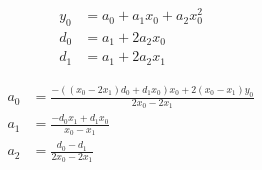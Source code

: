 \begin{align}
  y_0 & = a_0+a_1 x_0+a_2 x_0^{2}  \\
   d_0 & = a_1+2 a_2 x_0  \\
   d_1 & = a_1+2 a_2 x_1  
\end{align}

 
\begin{align}
  a_0 & = \frac
{ -  \left(  \left( x_0 - 2 x_1 \right)  d_0+d_1 x_0 \right)  x_0+2  \left( x_0 - x_1  \right)  y_0}
{2 x_0 - 2 x_1} \\
   a_1 & = \frac
{ - d_0 x_1+d_1 x_0}
{x_0 - x_1} \\
   a_2 & = \frac
{d_0 - d_1}
{2 x_0 - 2 x_1} 
\end{align}
